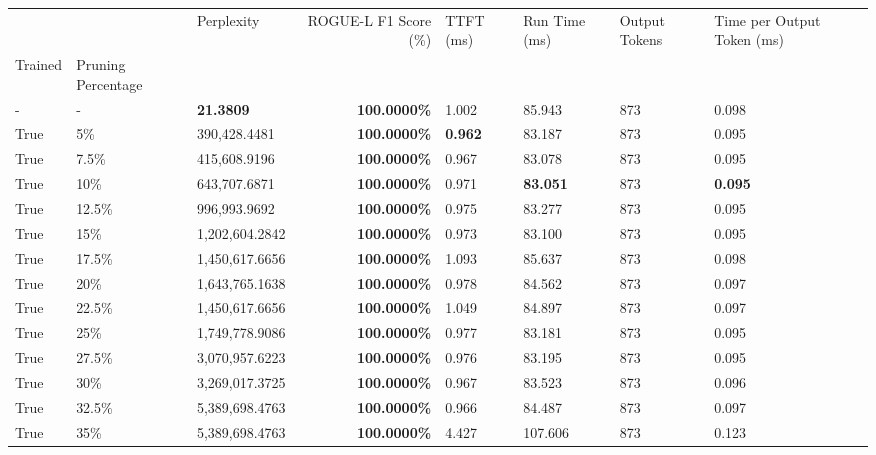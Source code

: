 \begin{table}[H]
{\label{tab:evaluation-pipeline-6-trained}
\begin{tabular}{lllrllll}
\toprule
 &  & Perplexity & ROGUE-L F1 Score (\%) & TTFT (ms) & Run Time (ms) & Output Tokens & Time per Output Token (ms) \\
Trained & Pruning Percentage &  &  &  &  &  &  \\
\midrule
- & - & \bfseries 21.3809 & \bfseries 100.0000\% & 1.002 & 85.943 & 873 & 0.098 \\
\cline{1-8} \cline{2-8}
True & 5\% & 390,428.4481 & \bfseries \color{red} 100.0000\% & \bfseries \color{red} 0.962 & 83.187 & 873 & 0.095 \\
\cline{1-8} \cline{2-8}
True & 7.5\% & 415,608.9196 & \bfseries \color{red} 100.0000\% & 0.967 & 83.078 & 873 & 0.095 \\
\cline{1-8} \cline{2-8}
True & 10\% & 643,707.6871 & \bfseries \color{red} 100.0000\% & 0.971 & \bfseries \color{red} 83.051 & 873 & \bfseries \color{red} 0.095 \\
\cline{1-8} \cline{2-8}
True & 12.5\% & 996,993.9692 & \bfseries \color{red} 100.0000\% & 0.975 & 83.277 & 873 & 0.095 \\
\cline{1-8} \cline{2-8}
True & 15\% & 1,202,604.2842 & \bfseries \color{red} 100.0000\% & 0.973 & 83.100 & 873 & 0.095 \\
\cline{1-8} \cline{2-8}
True & 17.5\% & 1,450,617.6656 & \bfseries \color{red} 100.0000\% & 1.093 & 85.637 & 873 & 0.098 \\
\cline{1-8} \cline{2-8}
True & 20\% & 1,643,765.1638 & \bfseries \color{red} 100.0000\% & 0.978 & 84.562 & 873 & 0.097 \\
\cline{1-8} \cline{2-8}
True & 22.5\% & 1,450,617.6656 & \bfseries \color{red} 100.0000\% & 1.049 & 84.897 & 873 & 0.097 \\
\cline{1-8} \cline{2-8}
True & 25\% & 1,749,778.9086 & \bfseries \color{red} 100.0000\% & 0.977 & 83.181 & 873 & 0.095 \\
\cline{1-8} \cline{2-8}
True & 27.5\% & 3,070,957.6223 & \bfseries \color{red} 100.0000\% & 0.976 & 83.195 & 873 & 0.095 \\
\cline{1-8} \cline{2-8}
True & 30\% & 3,269,017.3725 & \bfseries \color{red} 100.0000\% & 0.967 & 83.523 & 873 & 0.096 \\
\cline{1-8} \cline{2-8}
True & 32.5\% & 5,389,698.4763 & \bfseries \color{red} 100.0000\% & 0.966 & 84.487 & 873 & 0.097 \\
\cline{1-8} \cline{2-8}
True & 35\% & 5,389,698.4763 & \bfseries \color{red} 100.0000\% & 4.427 & 107.606 & 873 & 0.123 \\

\end{tabular}}
\end{table}
